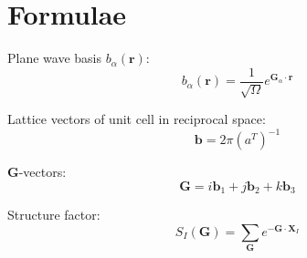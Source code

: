 \chapter{Formulae}

Plane wave basis $b_{\alpha}(\mathbf{r})$:
\begin{equation}
b_{\alpha}(\mathbf{r}) = \frac{1}{\sqrt{\Omega}} e^{\mathbf{G}_{\alpha}\cdot\mathbf{r}}
\end{equation}

Lattice vectors of unit cell in reciprocal space:
\begin{equation}\label{eq:recvecs}
\mathbf{b} = 2\pi\left( a^{T} \right)^{-1}
\end{equation}

\textbf{G}-vectors:
\begin{equation}
\mathbf{G} = i \mathbf{b}_{1} + j \mathbf{b}_{2} + k \mathbf{b}_{3}
\end{equation}

Structure factor:
\begin{equation}
S_{I}(\mathbf{G}) = \sum_{\mathbf{G}} e^{ -\mathbf{G}\cdot\mathbf{X}_{I} }
\end{equation}
